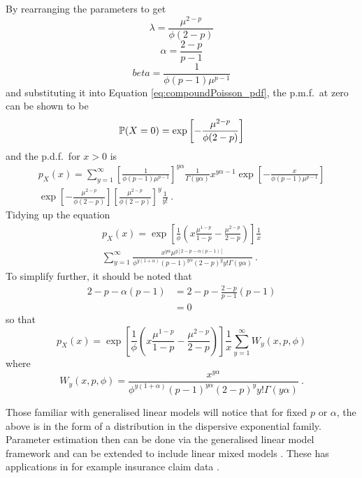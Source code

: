 By rearranging the parameters to get
\begin{equation}
	\lambda=\frac{\mu^{2-p}}{\phi(2-p)}
\end{equation}
\begin{equation}
	\alpha=\frac{2-p}{p-1}
\end{equation}
\begin{equation}
	beta=\frac{1}{\phi(p-1)\mu^{p-1}}
\end{equation}
and substituting it into Equation \eqref{eq:compoundPoisson_pdf}, the p.m.f.~at zero can be shown to be
\begin{equation}
	\operatorname{\mathbb{P}}(X=0) = \exp
	\left[
	    -\frac{\mu^{2-p}}{\phi(2-p)}
	\right]
\end{equation}
and the p.d.f.~for $x>0$ is
\begin{multline*}
	p_X(x) = \sum_{y=1}^{\infty}
	\left[
		\frac{1}{\phi(p-1)\mu^{p-1}}
	\right]^{y\alpha}
	\frac{1}{\Gamma(y\alpha)}
	x^{y\alpha-1}
	\exp\left[
	    -\frac{x}{\phi(p-1)\mu^{p-1}}
	\right]
	\\
	\exp\left[
	    -\frac{\mu^{2-p}}{\phi(2-p)}
	\right]
	\left[
		\frac{\mu^{2-p}}{\phi(2-p)}
	\right]^y
	\frac{1}{y!}
	\ .
\end{multline*}
Tidying up the equation
\begin{multline*}
	p_X(x) = 
	\exp\left[
		\frac{1}{\phi}\left(x\frac{\mu^{1-p}}{1-p}-\frac{\mu^{2-p}}{2-p}\right)
	\right]
	\frac{1}{x}
	\\
	\sum_{y=1}^{\infty}\frac{x^{y\alpha}\mu^{y[2-p-\alpha(p-1)]}}{\phi^{y(1+\alpha)}(p-1)^{y\alpha}(2-p)^yy!\Gamma(y\alpha)}
	\ .
\end{multline*}
To simplify further, it should be noted that
\begin{align*}
	2-p-\alpha(p-1) &= 2-p - \frac{2-p}{p-1}(p-1)
	\\&=0
\end{align*}
so that
\begin{equation}
	p_X(x) = 
	\exp\left[
		\frac{1}{\phi}
		\left(
			x\frac{\mu^{1-p}}{1-p}-\frac{\mu^{2-p}}{2-p}
		\right)
	\right]
	\frac{1}{x}
	\sum_{y=1}^{\infty}W_y(x,p,\phi)
\end{equation}
where
\begin{equation}
	W_y(x,p,\phi)=\frac{x^{y\alpha}}{\phi^{y(1+\alpha)}(p-1)^{y\alpha}(2-p)^yy!\Gamma(y\alpha)}
	\ .
\end{equation}

Those familiar with generalised linear models \citep{nelder1972generalized} \citep{mccullagh1984generalized} will notice that for fixed $p$ or $\alpha$, the above is in the form of a distribution in the dispersive exponential family. Parameter estimation then can be done via the generalised linear model framework and can be extended to include linear mixed models \citep{zhang2013likelihood}. These has applications in for example insurance claim data \citep{jorgensen1994fitting} \citep{smyth2002fitting}.

